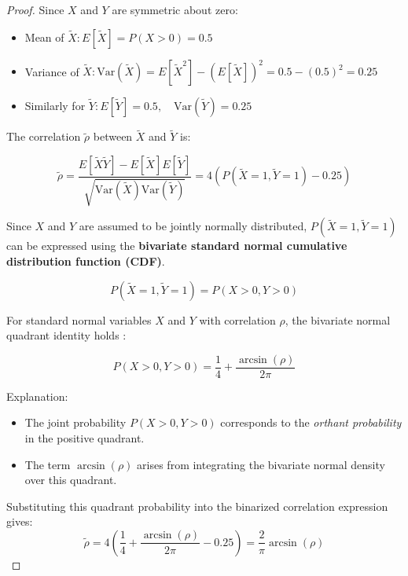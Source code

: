 \begin{proof}
Since $ X $ and $ Y $ are symmetric about zero:

\begin{itemize}
	\setlength\itemsep{-0.5em} %
	\item Mean of $ \tilde{X} :	E[\tilde{X}] = P(X > 0) = 0.5 $
	\item Variance of $ \tilde{X} :	\text{Var}(\tilde{X}) = E[\tilde{X}^2] - (E[\tilde{X}])^2 = 0.5 - (0.5)^2 = 0.25 $
	\item Similarly for $ \tilde{Y} : E[\tilde{Y}] = 0.5, \quad \text{Var}(\tilde{Y}) = 0.25 $
\end{itemize}

The correlation $ \tilde{\rho} $ between $ \tilde{X} $ and $ \tilde{Y} $ is:

\begin{equation}\label{eq:app-lemma1-binarized-correlation-definition}
\tilde{\rho} = \frac{E[\tilde{X} \tilde{Y}] - E[\tilde{X}] E[\tilde{Y}]}{\sqrt{\text{Var}(\tilde{X}) \text{Var}(\tilde{Y})}} = 4 \left( P(\tilde{X} = 1, \tilde{Y} = 1) - 0.25 \right)
\end{equation}

Since $ X $ and $ Y $ are assumed to be jointly normally distributed, $ P(\tilde{X} = 1, \tilde{Y} = 1) $ can be expressed using the \textbf{bivariate standard normal cumulative distribution function (CDF)}.

\begin{equation}\label{eq:app-lemma1-positive-quadrant-probability}
P(\tilde{X} = 1, \tilde{Y} = 1) = P(X > 0, Y > 0)
\end{equation}

For standard normal variables $ X $ and $ Y $ with correlation $ \rho $, the bivariate normal quadrant identity holds \cite{WFSheppard1899Application}:

\begin{equation}\label{eq:app-lemma1-gaussian-orthant-probability}
P(X > 0, Y > 0) = \frac{1}{4} + \frac{\arcsin(\rho)}{2\pi}
\end{equation}

Explanation:
\begin{itemize}
	\setlength\itemsep{-0.5em} %
	\item The joint probability $ P(X > 0, Y > 0) $ corresponds to the \textit{orthant probability} in the positive quadrant.
	\item The term $ \arcsin(\rho) $ arises from integrating the bivariate normal density over this quadrant.
\end{itemize}

Substituting this quadrant probability into the binarized correlation expression gives:
\begin{equation}\label{eq:app-lemma1-arcsin-substitution}
\tilde{\rho} = 4 \left( \frac{1}{4} + \frac{\arcsin(\rho)}{2\pi} - 0.25 \right)
= \frac{2}{\pi} \arcsin(\rho)
\end{equation}
\end{proof}

